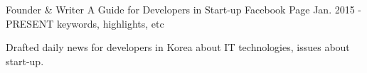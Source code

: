

\begin{cventries}

  \cventry
    {Founder \& Writer} %
    {A Guide for Developers in Start-up} %
    {Facebook Page} %
    {Jan. 2015 - PRESENT} %
    {keywords, highlights, etc} %
    {
      \begin{cvitems} %
        \item {Drafted daily news for developers in Korea about IT technologies, issues about start-up.}
      \end{cvitems}
    }

\end{cventries}
